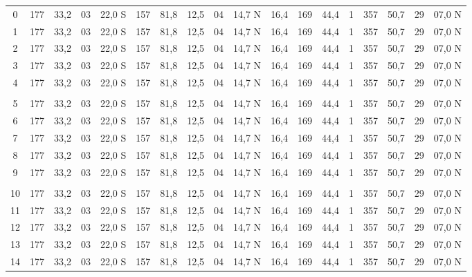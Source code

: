 \documentclass[a4paper]{article}
\begin{document}
\begin{center}
{\begin{tabular}{ c | c c | c c | c c | c | c c | c | c c | c | c c | c c}
    0 & 177 & 33,2 & 03 & 22,0 S & 157 & 81,8 & 12,5 & 04 & 14,7 N & 16,4 & 169 & 44,4 & 1 & 357 & 50,7 & 29 & 07,0 N \\ 
    1 & 177 & 33,2 & 03 & 22,0 S & 157 & 81,8 & 12,5 & 04 & 14,7 N & 16,4 & 169 & 44,4 & 1 & 357 & 50,7 & 29 & 07,0 N \\ 
    2 & 177 & 33,2 & 03 & 22,0 S & 157 & 81,8 & 12,5 & 04 & 14,7 N & 16,4 & 169 & 44,4 & 1 & 357 & 50,7 & 29 & 07,0 N \\ 
    3 & 177 & 33,2 & 03 & 22,0 S & 157 & 81,8 & 12,5 & 04 & 14,7 N & 16,4 & 169 & 44,4 & 1 & 357 & 50,7 & 29 & 07,0 N \\ 
    4 & 177 & 33,2 & 03 & 22,0 S & 157 & 81,8 & 12,5 & 04 & 14,7 N & 16,4 & 169 & 44,4 & 1 & 357 & 50,7 & 29 & 07,0 N \\ 
      &     &      &    &        &     &      &      &    &        &      &     &      &   &     &      &    &        \\ 
    5 & 177 & 33,2 & 03 & 22,0 S & 157 & 81,8 & 12,5 & 04 & 14,7 N & 16,4 & 169 & 44,4 & 1 & 357 & 50,7 & 29 & 07,0 N \\ 
    6 & 177 & 33,2 & 03 & 22,0 S & 157 & 81,8 & 12,5 & 04 & 14,7 N & 16,4 & 169 & 44,4 & 1 & 357 & 50,7 & 29 & 07,0 N \\ 
    7 & 177 & 33,2 & 03 & 22,0 S & 157 & 81,8 & 12,5 & 04 & 14,7 N & 16,4 & 169 & 44,4 & 1 & 357 & 50,7 & 29 & 07,0 N \\ 
    8 & 177 & 33,2 & 03 & 22,0 S & 157 & 81,8 & 12,5 & 04 & 14,7 N & 16,4 & 169 & 44,4 & 1 & 357 & 50,7 & 29 & 07,0 N \\ 
    9 & 177 & 33,2 & 03 & 22,0 S & 157 & 81,8 & 12,5 & 04 & 14,7 N & 16,4 & 169 & 44,4 & 1 & 357 & 50,7 & 29 & 07,0 N \\ 
      &     &      &    &        &     &      &      &    &        &      &     &      &   &     &      &    &        \\ 
    10 & 177 & 33,2 & 03 & 22,0 S & 157 & 81,8 & 12,5 & 04 & 14,7 N & 16,4 & 169 & 44,4 & 1 & 357 & 50,7 & 29 & 07,0 N \\ 
    11 & 177 & 33,2 & 03 & 22,0 S & 157 & 81,8 & 12,5 & 04 & 14,7 N & 16,4 & 169 & 44,4 & 1 & 357 & 50,7 & 29 & 07,0 N \\ 
    12 & 177 & 33,2 & 03 & 22,0 S & 157 & 81,8 & 12,5 & 04 & 14,7 N & 16,4 & 169 & 44,4 & 1 & 357 & 50,7 & 29 & 07,0 N \\ 
    13 & 177 & 33,2 & 03 & 22,0 S & 157 & 81,8 & 12,5 & 04 & 14,7 N & 16,4 & 169 & 44,4 & 1 & 357 & 50,7 & 29 & 07,0 N \\ 
    14 & 177 & 33,2 & 03 & 22,0 S & 157 & 81,8 & 12,5 & 04 & 14,7 N & 16,4 & 169 & 44,4 & 1 & 357 & 50,7 & 29 & 07,0 N \\ 

\end{tabular}}
\end{center}
\end{document}
